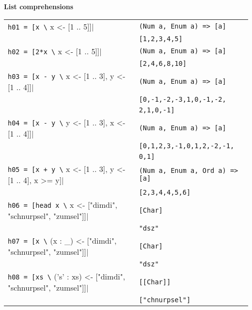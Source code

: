 \textbf{List comprehensions}\\
\begin{tabularx}{\linewidth}{|X|X|}
  \hline
  \lstinline|h01 = [x \| x <- [1 .. 5]]| & \lstinline|(Num a, Enum a) => [a]|\\
   & \lstinline|[1,2,3,4,5]|\\
  \hline
  \lstinline|h02 = [2*x \| x <- [1 .. 5]]| & \lstinline|(Num a, Enum a) => [a]|\\
  & \lstinline|[2,4,6,8,10]|\\
  \hline
  \lstinline|h03 = [x - y \| x <- [1 .. 3], y <- [1 .. 4]]| & \lstinline|(Num a, Enum a) => [a]|\\
   & \lstinline|[0,-1,-2,-3,1,0,-1,-2,|\\ %
   & \lstinline|2,1,0,-1]|\\
  \hline
  \lstinline|h04 = [x - y \| y <- [1 .. 3], x <- [1 .. 4]]| & \lstinline|(Num a, Enum a) => [a]|\\
   & \lstinline|[0,1,2,3,-1,0,1,2,-2,-1,|\\
   & \lstinline|0,1]|\\
  \hline
  \lstinline|h05 = [x + y \| x <- [1 .. 3], y <- [1 .. 4], x >= y]| & \lstinline|(Num a, Enum a, Ord a) => [a]|\\
   & \lstinline|[2,3,4,4,5,6]|\\
  \hline
  \lstinline|h06 = [head x \| x <- ["dimdi", "schnurpsel", "zumsel"]]| & \lstinline|[Char]|\\
   & \lstinline|"dsz"|\\
  \hline
  \lstinline|h07 = [x \| (x : _) <- ["dimdi", "schnurpsel", "zumsel"]]| & \lstinline|[Char]|\\
   & \lstinline|"dsz"|\\
  \hline
  \lstinline|h08 = [xs \| ('s' : xs) <- ["dimdi", "schnurpsel", "zumsel"]]| & \lstinline|[[Char]]|\\
   & \lstinline|["chnurpsel"]|\\
  \hline
\end{tabularx}